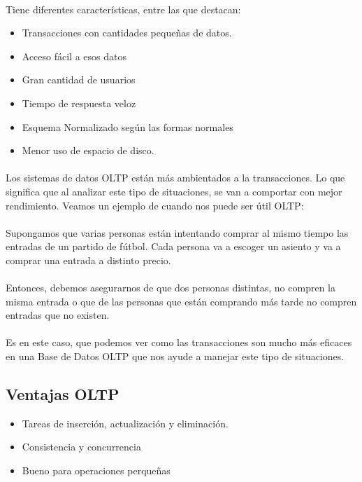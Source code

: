 \documentclass[a4paper 
,twoside
]{article}
\begin{document}
  \paragraph{}
  Tiene diferentes características, entre las que destacan:
  \begin{itemize}
    \item Transacciones con cantidades pequeñas de datos.
    \item Acceso fácil a esos datos
    \item Gran cantidad de usuarios
    \item Tiempo de respuesta veloz
    \item Esquema Normalizado según las formas normales
    \item Menor uso de espacio de disco.
  \end{itemize}

  \paragraph{}
  Los sistemas de datos OLTP están más ambientados a la transacciones. Lo que significa que al analizar este tipo de situaciones, se van a comportar con mejor rendimiento. Veamos un ejemplo de cuando nos puede ser útil OLTP:

  \paragraph{}
  Supongamos que varias personas están intentando comprar al mismo tiempo las entradas de un partido de fútbol. Cada persona va a escoger un asiento y va a comprar una entrada a distinto precio.

  \paragraph{}
  Entonces, debemos asegurarnos de que dos personas distintas, no compren la misma entrada o que de las personas que están comprando más tarde no compren entradas que no existen. 

  \paragraph{}
  Es en este caso, que podemos ver como las transacciones son mucho más eficaces en una Base de Datos OLTP que nos ayude a manejar este tipo de situaciones.



  \subsection{Ventajas OLTP}
  \begin{itemize}
    \item Tareas de inserción, actualización y eliminación.
    \item Consistencia y concurrencia
    \item Bueno para operaciones perqueñas
  \end{itemize}
\end{document}

